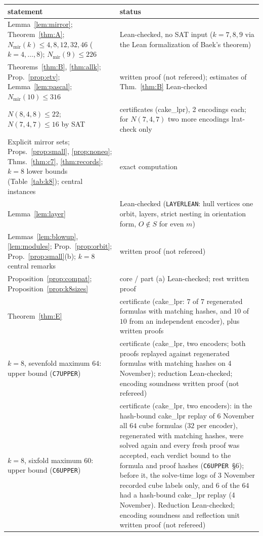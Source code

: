 \documentclass[10pt]{article}
\theoremstyle{definition}
\theoremstyle{remark}
\newcommand{\Nm}{N_{\mathrm{mir}}}
\begin{document}
\begin{table}[ht]
\centering\footnotesize
\begin{tabular}{@{}p{}p{}@{}}
\toprule
statement & status\\
\midrule
Lemma~\ref{lem:mirror}; Theorem~\ref{thm:A}; $\Nm(k)\le4,8,12,32,46$ ($k=4,\dots,8$); $\Nm(9)\le226$ & Lean-checked, no SAT input ($k=7,8,9$ via the Lean formalization of Baek's theorem)\\
Theorems~\ref{thm:B}, \ref{thm:allk}; Prop.~\ref{prop:etv}; Lemma~\ref{lem:pascal}; $\Nm(10)\le316$ & written proof (not refereed); estimates of Thm.~\ref{thm:B} Lean-checked\\
$N(8,4,8)\le22$; $N(7,4,7)\le16$ by SAT & certificates (cake\_lpr), 2 encodings each; for $N(7,4,7)$ two more encodings lrat-check only\\
Explicit mirror sets; Props.~\ref{prop:small}, \ref{prop:noneq}; Thms.~\ref{thm:c7}, \ref{thm:records}; $k=8$ lower bounds (Table~\ref{tab:k8}); central instances & exact computation\\
Lemma~\ref{lem:layer} & Lean-checked (\texttt{LAYERLEAN}: hull vertices one orbit, layers, strict nesting in orientation form, $O\notin S$ for even $m$)\\
Lemmas~\ref{lem:blowup}, \ref{lem:modules}; Prop.~\ref{prop:orbit}; Prop.~\ref{prop:small}(b); $k=8$ central remarks & written proof (not refereed)\\
Proposition~\ref{prop:compat}; Proposition~\ref{prop:k8sizes} & core / part (a) Lean-checked; rest written proof\\
Theorem~\ref{thm:E} & certificate (cake\_lpr: $7$ of $7$ regenerated formulas with matching hashes, and $10$ of $10$ from an independent encoder), plus written proofs\\
$k=8$, sevenfold maximum $64$: upper bound (\texttt{C7UPPER}) & certificate (cake\_lpr, two encoders; both proofs replayed against regenerated formulas with matching hashes on 4 November); reduction Lean-checked; encoding soundness written proof (not refereed)\\
$k=8$, sixfold maximum $60$: upper bound (\texttt{C6UPPER}) & certificate (cake\_lpr, two encoders): in the hash-bound cake\_lpr replay of 6 November all $64$ cube formulas ($32$ per encoder), regenerated with matching hashes, were solved again and every fresh proof was accepted, each verdict bound to the formula and proof hashes (\texttt{C6UPPER}~\S6); before it, the solve-time logs of 3 November recorded cube labels only, and $6$ of the $64$ had a hash-bound cake\_lpr replay (4 November). Reduction Lean-checked; encoding soundness and reflection unit written proof (not refereed)\\

\end{tabular}
\end{table}
\end{document}
